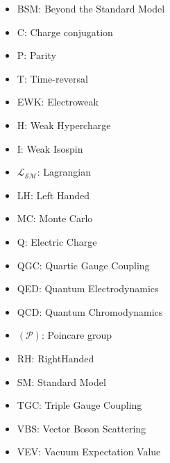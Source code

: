 \begin{itemize}
\item{BSM: Beyond the Standard Model}
\item {C: Charge conjugation}
\item{P: Parity}
\item{T: Time-reversal}
\item{EWK: Electroweak}
\item{H: Weak Hypercharge}
\item{ I: Weak Isospin}
\item{$\mathcal{L_{SM}}$: Lagrangian}
\item{LH:  Left Handed}
\item{MC: Monte Carlo}
\item{Q: Electric Charge}
\item{QGC: Quartic Gauge Coupling}
\item{QED: Quantum Electrodynamics}
\item{QCD: Quantum Chromodynamics}
\item{$(\mathcal{P})$: Poincare group}
\item{RH: RightHanded}
\item{SM: Standard Model}
\item{TGC: Triple Gauge Coupling}
\item{VBS: Vector Boson Scattering}
\item{VEV: Vacuum Expectation Value}
\end{itemize}